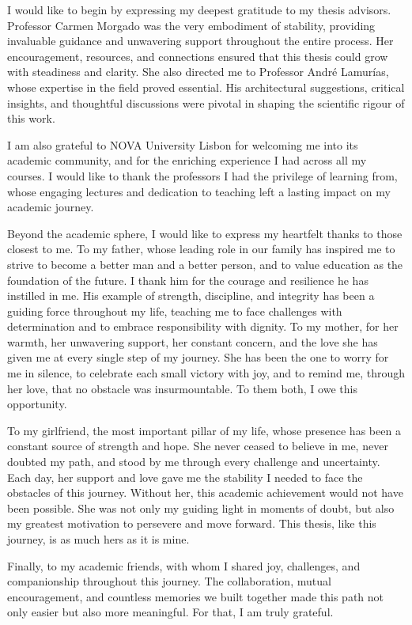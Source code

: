 
%

\begin{ntacknowledgements}
I would like to begin by expressing my deepest gratitude to my thesis advisors.
Professor Carmen Morgado was the very embodiment of stability, providing invaluable guidance and unwavering support throughout the entire process. Her encouragement, resources, and connections ensured that this thesis could grow with steadiness and clarity. She also directed me to Professor André Lamurías, whose expertise in the field proved essential. His architectural suggestions, critical insights, and thoughtful discussions were pivotal in shaping the scientific rigour of this work.

I am also grateful to NOVA University Lisbon for welcoming me into its academic community, and for the enriching experience I had across all my courses. I would like to thank the professors I had the privilege of learning from, whose engaging lectures and dedication to teaching left a lasting impact on my academic journey.

Beyond the academic sphere, I would like to express my heartfelt thanks to those closest to me.
To my father, whose leading role in our family has inspired me to strive to become a better man and a better person, and to value education as the foundation of the future. I thank him for the courage and resilience he has instilled in me. His example of strength, discipline, and integrity has been a guiding force throughout my life, teaching me to face challenges with determination and to embrace responsibility with dignity.
To my mother, for her warmth, her unwavering support, her constant concern, and the love she has given me at every single step of my journey. She has been the one to worry for me in silence, to celebrate each small victory with joy, and to remind me, through her love, that no obstacle was insurmountable.
To them both, I owe this opportunity.

To my girlfriend, the most important pillar of my life, whose presence has been a constant source of strength and hope. She never ceased to believe in me, never doubted my path, and stood by me through every challenge and uncertainty. Each day, her support and love gave me the stability I needed to face the obstacles of this journey. Without her, this academic achievement would not have been possible. She was not only my guiding light in moments of doubt, but also my greatest motivation to persevere and move forward. This thesis, like this journey, is as much hers as it is mine.

Finally, to my academic friends, with whom I shared joy, challenges, and companionship throughout this journey. The collaboration, mutual encouragement, and countless memories we built together made this path not only easier but also more meaningful. For that, I am truly grateful.
\end{ntacknowledgements}